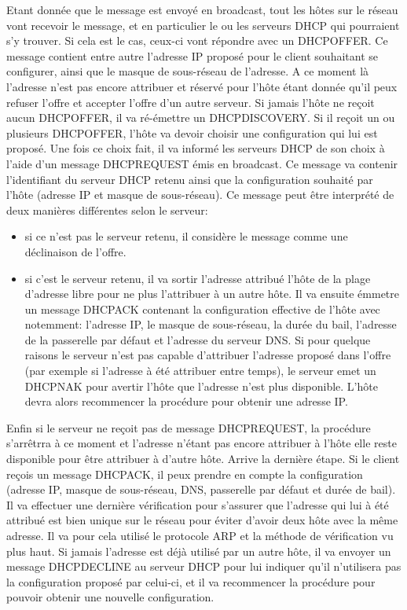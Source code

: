 Etant donnée que le message est envoyé en broadcast, tout les hôtes sur le
réseau vont recevoir le message, et en particulier le ou les serveurs DHCP qui
pourraient s'y trouver. Si cela est le cas, ceux-ci vont répondre avec un
DHCPOFFER. Ce message contient entre autre l'adresse IP proposé pour le client
souhaitant se configurer, ainsi que le masque de sous-réseau de l'adresse. A ce
moment là l'adresse n'est pas encore attribuer et réservé pour l'hôte étant
donnée qu'il peux refuser l'offre et accepter l'offre d'un autre serveur. Si
jamais l'hôte ne reçoit aucun DHCPOFFER, il va ré-émettre un DHCPDISCOVERY. Si
il reçoit un ou plusieurs DHCPOFFER, l'hôte va devoir choisir une configuration
qui lui est proposé. Une fois ce choix fait, il va informé les serveurs DHCP de
son choix à l'aide d'un message DHCPREQUEST émis en broadcast. Ce message va
contenir l'identifiant du serveur DHCP retenu ainsi que la configuration
souhaité par l'hôte (adresse IP et masque de sous-réseau). Ce message peut être
interprété de deux manières différentes selon le serveur:
\begin{itemize}
\item si ce n'est pas le serveur retenu, il considère le message comme une
déclinaison de l'offre.

\item si c'est le serveur retenu, il va sortir l'adresse attribué l'hôte de la
plage d'adresse libre pour ne plus l'attribuer à un autre hôte. Il va ensuite
émmetre un message DHCPACK contenant la configuration effective de l'hôte avec
notemment: l'adresse IP, le masque de sous-réseau, la durée du bail, l'adresse
de la passerelle par défaut et l'adresse du serveur DNS.  Si pour quelque
raisons le serveur n'est pas capable d'attribuer l'adresse proposé dans l'offre
(par exemple si l'adresse à été attribuer entre temps), le serveur emet un
DHCPNAK pour avertir l'hôte que l'adresse n'est plus disponible. L'hôte devra
alors recommencer la procédure pour obtenir une adresse IP.
\end{itemize}

Enfin si le serveur ne reçoit pas de message DHCPREQUEST, la procédure
s'arrêtrra à ce moment et l'adresse n'étant pas encore attribuer à l'hôte elle
reste disponible pour être attribuer à d'autre hôte.  Arrive la dernière étape.
Si le client reçois un message DHCPACK, il peux prendre en compte la
configuration (adresse IP, masque de sous-réseau, DNS, passerelle par défaut et
durée de bail). Il va effectuer une dernière vérification pour s'assurer que
l'adresse qui lui à été attribué est bien unique sur le réseau pour éviter
d'avoir deux hôte avec la même adresse. Il va pour cela utilisé le protocole
ARP et la méthode de vérification vu plus haut. Si jamais l'adresse est déjà
utilisé par un autre hôte, il va envoyer un message DHCPDECLINE au serveur DHCP
pour lui indiquer qu'il n'utilisera pas la configuration proposé par celui-ci,
et il va recommencer la procédure pour pouvoir obtenir une nouvelle
configuration.

